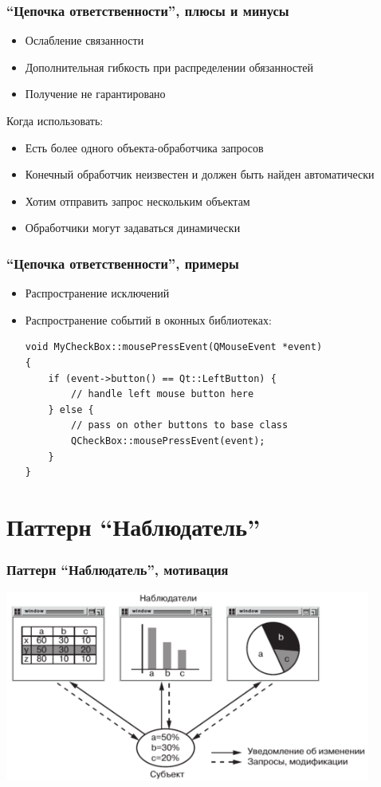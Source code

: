 \documentclass[xetex,mathserif,serif]{beamer}
\begin{document}
	\begin{frame}
		\frametitle{``Цепочка ответственности'', плюсы и минусы}
		\begin{itemize}
			\item Ослабление связанности
			\item Дополнительная гибкость при распределении обязанностей
			\item Получение не гарантировано
		\end{itemize}
		Когда использовать:
		\begin{itemize}
			\item Есть более одного объекта-обработчика запросов
			\item Конечный обработчик неизвестен и должен быть найден автоматически
			\item Хотим отправить запрос нескольким объектам
			\item Обработчики могут задаваться динамически
		\end{itemize}
	\end{frame}

	\begin{frame}[fragile]
		\frametitle{``Цепочка ответственности'', примеры}
		\begin{itemize}
			\item Распространение исключений
			\item Распространение событий в оконных библиотеках:
			\begin{verbatim}
void MyCheckBox::mousePressEvent(QMouseEvent *event)
{
    if (event->button() == Qt::LeftButton) {
        // handle left mouse button here
    } else {
        // pass on other buttons to base class
        QCheckBox::mousePressEvent(event);
    }
}
			\end{verbatim}
		\end{itemize}
	\end{frame}

	\section{Паттерн ``Наблюдатель''}

	\begin{frame}
		\frametitle{Паттерн ``Наблюдатель'', мотивация}
		\begin{center}
			\includegraphics[width=0.9\textwidth]{observerExample.png}
		\end{center}
	\end{frame}
\end{document}
